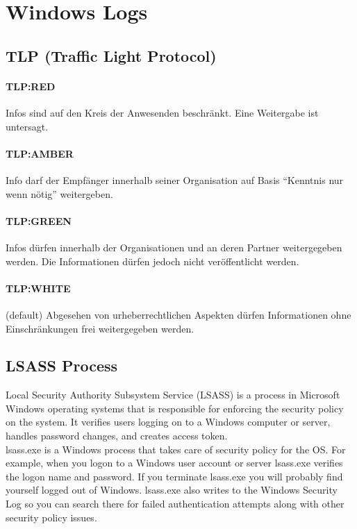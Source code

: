 \section{Windows Logs}
\subsection{TLP (Traffic Light Protocol)}
\paragraph{TLP:RED}
Infos sind auf den Kreis der Anwesenden beschränkt. Eine Weitergabe ist untersagt.

\paragraph{TLP:AMBER}
Info darf der Empfänger innerhalb seiner Organisation auf Basis ``Kenntnis nur wenn nötig'' weitergeben.

\paragraph{TLP:GREEN}
Infos dürfen innerhalb der Organisationen und an deren Partner weitergegeben werden. Die Informationen dürfen jedoch nicht veröffentlicht werden.

\paragraph{TLP:WHITE}
(default) Abgesehen von urheberrechtlichen Aspekten dürfen Informationen ohne Einschränkungen frei weitergegeben werden.

\subsection{LSASS Process}
Local Security Authority Subsystem Service (LSASS) is a process in Microsoft Windows operating systems that is responsible for enforcing the security policy on the system. It verifies users logging on to a Windows computer or server, handles password changes, and creates access token. \\

lsass.exe is a Windows process that takes care of security policy for the OS. For example, when you logon to a Windows user account or server lsass.exe verifies the logon name and password. If you terminate lsass.exe you will probably find yourself logged out of Windows. lsass.exe also writes to the Windows Security Log so you can search there for failed authentication attempts along with other security policy issues.

